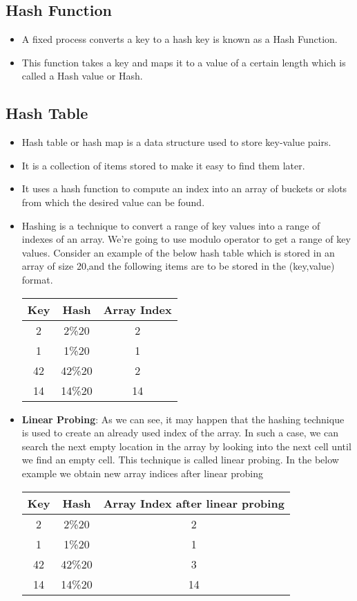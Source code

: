 \documentclass[journal,12pt,twocolumn]{IEEEtran}
\begin{document}
\subsection{\textbf{Hash Function}}
\begin{itemize}
\item A fixed process converts a key to a hash key is known as a Hash Function.
\item This function takes a key and maps it to a value of a certain length which is called a Hash value or Hash.
\end{itemize}
\subsection{\textbf{Hash Table}}
\begin{itemize}
\item Hash table or hash map is a data structure used to store key-value pairs.
\item It is a collection of items stored to make it easy to find them later.
\item It uses a hash function to compute an index into an array of buckets or slots from which the desired value can be found.
\item Hashing is a technique to convert a range of key values into a range of indexes of an array. We're going to use modulo operator to get a range of key values. Consider an example of the below hash table which is stored in an array of size 20,and the following items are to be stored in the (key,value) format.\\
\begin{center}
\begin{tabular}{ |c|c|c| } 
 \hline
Key  & Hash & Array Index \\
\hline
2  & 2\%20 & 2 \\
1  & 1\%20 & 1 \\
42  & 42\%20 & 2 \\
14  & 14\%20 & 14 \\
 \hline
\end{tabular}
\end{center}
\medskip
\item \textbf{Linear Probing}: As we can see, it may happen that the hashing technique is used to create an already used index of the array. In such a case, we can search the next empty location in the array by looking into the next cell until we find an empty cell. This technique is called linear probing.
In the below example we obtain new array indices after linear probing
\begin{center}
\begin{tabular}{ |c|c|c| } 
 \hline
Key  & Hash & Array Index after linear probing\\
\hline
2  & 2\%20 & 2 \\
1  & 1\%20 & 1 \\
42  & 42\%20 & 3 \\
14  & 14\%20 & 14 \\
 \hline
\end{tabular}
\end{center}
\end{itemize}
\end{document}
